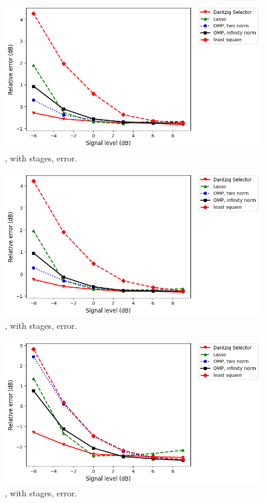 \begin {figure} [H]
\includegraphics [width = \textwidth] {error-medium-tall-two.png}
\caption {, with  stages, error.}
\end {figure}

\begin {figure} [H]
\includegraphics [width = \textwidth] {error-medium-wide-two.png}
\caption {, with  stages, error.}
\end {figure}

\begin {figure} [H]
\includegraphics [width = \textwidth] {error-medium-square-four.png}
\caption {, with  stages, error.}
\end {figure}

